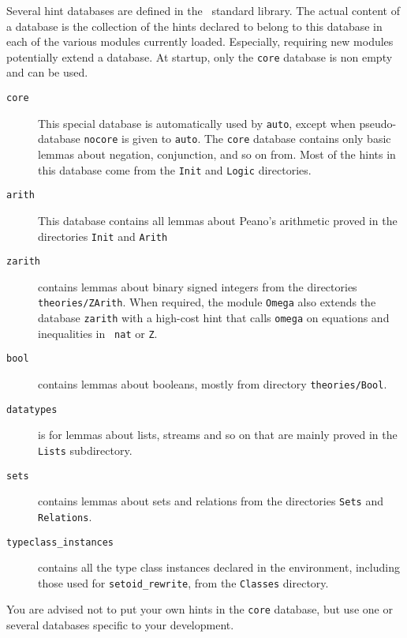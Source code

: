 \begin{coq_example*}
Several hint databases are defined in the \Coq\ standard library.  The
actual content of a database is the collection of the hints declared
to belong to this database in each of the various modules currently
loaded.  Especially, requiring new modules potentially extend a
database. At {\Coq} startup, only the {\tt core} database is non empty
and can be used.

\begin{description}

\item[\tt core] This special database is automatically used by
  \texttt{auto}, except when pseudo-database \texttt{nocore} is
  given to \texttt{auto}. The \texttt{core} database contains
  only basic lemmas about negation,
  conjunction, and so on from. Most of the hints in this database come
  from the \texttt{Init} and \texttt{Logic} directories.

\item[\tt arith] This database contains all lemmas about Peano's
  arithmetic proved in the directories \texttt{Init} and
  \texttt{Arith}

\item[\tt zarith] contains lemmas about binary signed integers from
  the directories \texttt{theories/ZArith}. When required, the module
  {\tt Omega} also extends the database {\tt zarith} with a high-cost
  hint that calls {\tt omega} on equations and inequalities in {\tt
  nat} or {\tt Z}.

\item[\tt bool] contains lemmas about booleans, mostly from directory
  \texttt{theories/Bool}.

\item[\tt datatypes] is for lemmas about lists, streams and so on that
  are mainly proved in the \texttt{Lists} subdirectory.

\item[\tt sets] contains lemmas about sets and relations from the
  directories \texttt{Sets} and \texttt{Relations}.

\item[\tt typeclass\_instances] contains all the type class instances
  declared in the environment, including those used for \texttt{setoid\_rewrite},
  from the \texttt{Classes} directory.
\end{description}

You are advised not to put your own hints in the {\tt core} database,
but use one or several databases specific to your development.


\end{coq_example*}
